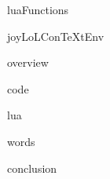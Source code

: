 
\usemodule[t-diSimp]

\startDiSimpComponent luaFunctions

\diSimpEnvironment joyLoLConTeXtEnv

\startJoyLoLCoAlg[title=Lua-Functions][luaFunctions]

\diSimpComponent overview

\diSimpComponent code

\diSimpComponent lua

\diSimpComponent words

\diSimpComponent conclusion

\stopJoyLoLCoAlg

\stopDiSimpComponent
